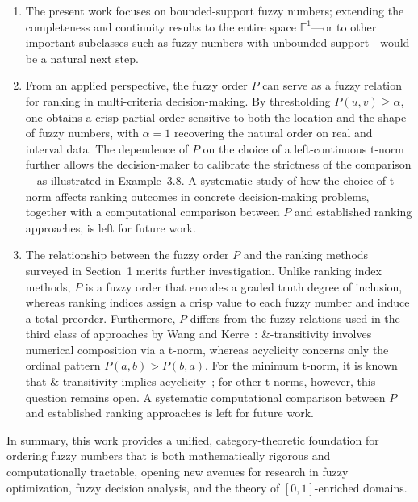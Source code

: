 \documentclass[preprint,3p,times]{elsarticle}
\theoremstyle{plain}
\theoremstyle{definition}
\numberwithin{equation}{section}
\begin{document}
\begin{enumerate}[label=(\arabic*)]
    \item The present work focuses on bounded-support fuzzy numbers;
    extending the completeness and continuity results to the entire space
    $\mathbb{E}^1$---or to other important subclasses such as fuzzy numbers
    with unbounded support---would be a natural next step.

 \item From an applied perspective, the fuzzy order $P$ can serve as a
fuzzy relation for ranking in multi-criteria decision-making. By
thresholding $P(u,v) \geq \alpha$, one obtains a crisp partial order
sensitive to both the location and the shape of fuzzy numbers, with
$\alpha=1$ recovering the natural order on real and interval data. The
dependence of $P$ on the choice of a left-continuous t-norm further allows
the decision-maker to calibrate the strictness of the comparison---as
illustrated in Example~3.8. A systematic study of how the choice of
t-norm affects ranking outcomes in concrete decision-making problems,
together with a computational comparison between $P$ and established
ranking approaches, is left for future work.

 \item The relationship between the fuzzy order $P$ and the ranking methods surveyed in Section~1 merits further investigation. Unlike ranking index methods, $P$ is a fuzzy order that encodes a graded truth degree of inclusion, whereas ranking indices assign a crisp value to each fuzzy number and induce a total preorder. Furthermore, $P$ differs from the fuzzy relations used in the third class of approaches by Wang and Kerre~\cite{WANG2001387}: $\&$-transitivity involves numerical composition via a t-norm, whereas acyclicity concerns only the ordinal pattern $P(a,b) > P(b,a)$. For the minimum t-norm, it is known that $\&$-transitivity implies acyclicity~\cite{WANG2001387}; for other t-norms, however, this question remains open. A systematic computational comparison between $P$ and established ranking approaches is left for future work.

\end{enumerate}


In summary, this work provides a unified, category-theoretic foundation for ordering fuzzy numbers that is both mathematically rigorous and computationally tractable, opening new avenues for research in fuzzy optimization, fuzzy decision analysis, and the theory of \([0,1]\)-enriched domains.
\end{document}
